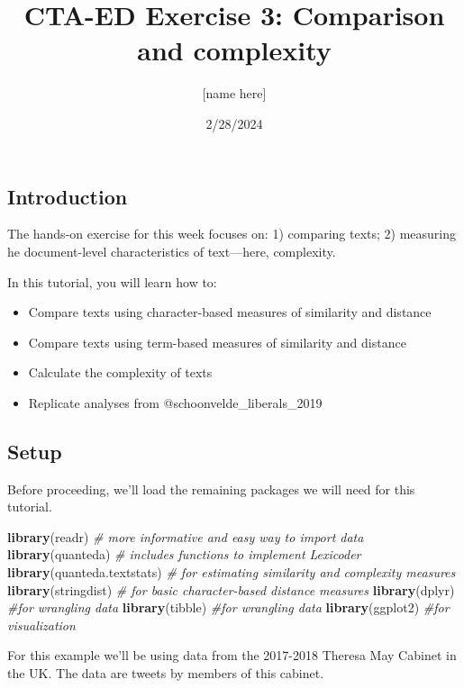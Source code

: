 \documentclass[
]{article}
\title{CTA-ED Exercise 3: Comparison and complexity}
\author{{[}name here{]}}
\date{2/28/2024}
\newenvironment{Shaded}{\begin{snugshade}}{\end{snugshade}}
\newcommand{\CommentTok}[1]{\textcolor[rgb]{0.56,0.35,0.01}{\textit{#1}}}
\newcommand{\FunctionTok}[1]{\textcolor[rgb]{0.13,0.29,0.53}{\textbf{#1}}}
\newcommand{\NormalTok}[1]{#1}
\providecommand{\tightlist}{%
  \setlength{\itemsep}{0pt}\setlength{\parskip}{0pt}}
\begin{document}
\maketitle

\subsection{Introduction}\label{introduction}

The hands-on exercise for this week focuses on: 1) comparing texts; 2)
measuring he document-level characteristics of text---here, complexity.

In this tutorial, you will learn how to:

\begin{itemize}
\tightlist
\item
  Compare texts using character-based measures of similarity and
  distance
\item
  Compare texts using term-based measures of similarity and distance
\item
  Calculate the complexity of texts
\item
  Replicate analyses from @schoonvelde\_liberals\_2019
\end{itemize}

\subsection{Setup}\label{setup}

Before proceeding, we'll load the remaining packages we will need for
this tutorial.

\begin{Shaded}
\begin{Highlighting}[]
\FunctionTok{library}\NormalTok{(readr) }\CommentTok{\# more informative and easy way to import data}
\FunctionTok{library}\NormalTok{(quanteda) }\CommentTok{\# includes functions to implement Lexicoder}
\FunctionTok{library}\NormalTok{(quanteda.textstats) }\CommentTok{\# for estimating similarity and complexity measures}
\FunctionTok{library}\NormalTok{(stringdist) }\CommentTok{\# for basic character{-}based distance measures }
\FunctionTok{library}\NormalTok{(dplyr) }\CommentTok{\#for wrangling data}
\FunctionTok{library}\NormalTok{(tibble) }\CommentTok{\#for wrangling data}
\FunctionTok{library}\NormalTok{(ggplot2) }\CommentTok{\#for visualization}
\end{Highlighting}
\end{Shaded}

For this example we'll be using data from the 2017-2018 Theresa May
Cabinet in the UK. The data are tweets by members of this cabinet.
\end{document}
